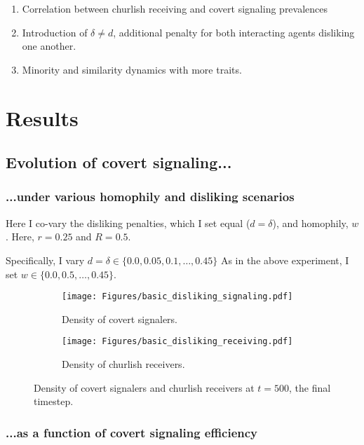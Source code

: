 \documentclass[11pt,letterpaper]{article}
\begin{document}
\begin{enumerate}
  \item Correlation between churlish receiving and covert signaling prevalences
  \item Introduction of $\delta \neq d$, additional penalty for both interacting
    agents disliking one another.
  \item Minority and similarity dynamics with more traits.
\end{enumerate}



\section{Results}

\subsection{Evolution of covert signaling...}

\subsubsection{...under various homophily and disliking scenarios}

Here I co-vary the disliking penalties, which I set equal ($d=\delta$), and
homophily, $w$. Here, $r=0.25$ and $R=0.5$. 

Specifically, I vary $d=\delta \in \{0.0, 0.05, 0.1, \ldots, 0.45\}$
As in the above experiment, I set $w \in \{0.0, 0.5, \ldots, 0.45\}$.

\begin{figure}[H]
  \centering
  \begin{subfigure}{0.49\textwidth}
    \centering
    \texttt{[image: Figures/basic\_disliking\_signaling.pdf]}
    \caption{Density of covert signalers.}
  \end{subfigure}
  \begin{subfigure}{0.49\textwidth}
    \centering
    \texttt{[image: Figures/basic\_disliking\_receiving.pdf]}
    \caption{Density of churlish receivers.}
  \end{subfigure}
  
  \caption{Density of covert signalers and churlish receivers at $t=500$, 
    the final timestep.}
  \label{fig:dislikingHomophilyHeatmap}
\end{figure}

\subsubsection{...as a function of covert signaling efficiency}
\end{document}
